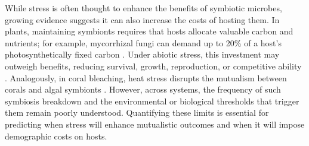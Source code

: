 \documentclass[12pt]{article}\usepackage[]{graphicx}\usepackage[dvipsnames]{xcolor}
\newcommand{\tom}[2]{{\color{red}{#1}}\footnote{\textit{\color{red}{#2}}}}
\begin{document}
While stress is often thought to enhance the benefits of symbiotic microbes, growing evidence suggests it can also increase the costs of hosting them. 
In plants, maintaining symbionts requires that hosts allocate valuable carbon and nutrients; for example, mycorrhizal fungi can demand up to 20\% of a host’s photosynthetically fixed carbon \citep{thirkell2020carbon,soudzilovskaia2015quantitative}.
Under abiotic stress, this investment may outweigh benefits, reducing survival, growth, reproduction, or competitive ability \citep{johnson1997functioning, bronstein2001exploitation, klironomos2003variation}. 
Analogously, in coral bleaching, heat stress disrupts the mutualism between corals and algal symbionts \citep{vidal2009coral, marangon2025destabilization}. 
However, across systems, the frequency of such symbiosis breakdown and the environmental or biological thresholds that trigger them remain poorly understood. 
Quantifying these limits is essential for predicting when stress will enhance mutualistic outcomes and when it will impose demographic costs on hosts.


\end{document}
